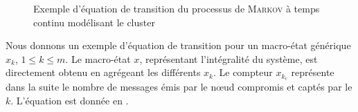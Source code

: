 \newlength\fboxlinelen
\setlength\fboxlinelen\linewidth
\addtolength\fboxlinelen{-2\fboxsep}
\addtolength\fboxlinelen{-2\fboxrule}
\begin{figure}[ht]
    \caption{Exemple d'équation de transition du processus de \textsc{Markov} à temps continu modélisant le cluster}\label{sa:fig:eqtrans}
\end{figure}

Nous donnons un exemple d'équation de transition pour un macro-état générique $x_k$, $1\leq k\leq m$.
Le macro-état $x$, représentant l'intégralité du système, est directement obtenu en agrégeant les différents $x_k$.
Le compteur $x_{k_c}$ représente dans la suite le nombre de messages émis par le nœud compromis et captés par le \cn $k$.
L'équation est donnée en .

